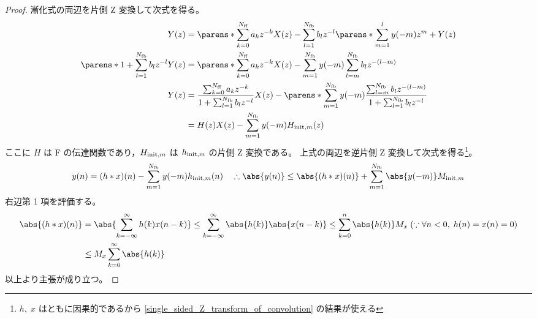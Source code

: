     \begin{proof}
        \quad\par
        漸化式の両辺を片側 Z 変換して次式を得る。
        \begin{align*}
            Y(z) &= \parens*{\sum_{k=0}^\Nff a_k z^{-k}}X(z) - \sum_{l=1}^\Nfb b_l z^{-l}\parens*{\sum_{m=1}^l y(-m)z^m + Y(z)} \\
            \parens*{1+\sum_{l=1}^\Nfb b_l z^{-l}}Y(z) &= \parens*{\sum_{k=0}^\Nff a_k z^{-k}}X(z) - \sum_{m=1}^\Nfb y(-m) \sum_{l=m}^\Nfb b_l z^{-(l-m)} \\
            Y(z) &= \frac{\sum_{k=0}^\Nff a_k z^{-k}}{1+\sum_{l=1}^\Nfb b_l z^{-l}}X(z) - \parens*{\sum_{m=1}^\Nfb y(-m)}\frac{\sum_{l=m}^\Nfb b_l z^{-(l-m)}}{1+\sum_{l=1}^\Nfb b_l z^{-l}} \\
            &= H(z)X(z) - \sum_{m=1}^\Nfb y(-m) \HInit{m}(z)
        \end{align*}
        ここに $H$ は F の伝達関数であり，${H_{\text{init},m}}$ は ${h_{\text{init},m}}$ の片側 Z 変換である。
        上式の両辺を逆片側 Z 変換して次式を得る\footnote{$h,\;x$ はともに因果的であるから \ref{single_sided_Z_transform_of_convolution} の結果が使える}。
        \[ y(n) = (h*x)(n) - \sum_{m=1}^\Nfb y(-m) \hInit{m}(n) \quad \therefore\abs{y(n)} \leq \abs{(h*x)(n)} + \sum_{m=1}^\Nfb \abs{y(-m)} \Minit{m} \]
        右辺第 1 項を評価する。
        \begin{align*}
            \abs{(h*x)(n)} &= \abs{\sum_{k=-\infty}^\infty h(k)x(n-k)} \leq \sum_{k=-\infty}^\infty \abs{h(k)}\abs{x(n-k)} \leq \sum_{k=0}^n \abs{h(k)}M_x\;(\because \forall n<0,\; h(n)=x(n)=0) \\
            &\leq M_x\sum_{k=0}^\infty \abs{h(k)}
        \end{align*}
        以上より主張が成り立つ。
    \end{proof}